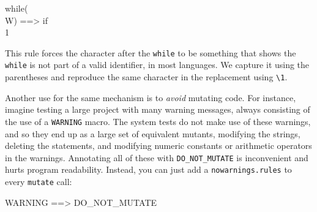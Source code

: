 \begin{code}
while(\\W) ==> if\\1 
\end{code}

\noindent This rule forces the character after the {\tt while} to be something
that shows the {\tt while} is not part of a valid identifier, in most
languages.  We capture it using the parentheses and reproduce the
same character in the replacement using {\tt \textbackslash1}.

Another use for the same mechanism is to \emph{avoid} mutating code.
For instance, imagine testing a large project with many warning
messages, always consisting of the use of a {\tt WARNING} macro.  The
system tests do not make use of these warnings, and so they end up as
a large set of equivalent mutants, modifying the strings, deleting the
statements, and modifying numeric constants or arithmetic operators in
the warnings.  Annotating all of these with {\tt DO\_NOT\_MUTATE} is
inconvenient and hurts program readability.  Instead, you can just add a
{\tt nowarnings.rules} to every {\tt mutate} call:

\begin{code}
WARNING ==> DO\_NOT\_MUTATE
\end{code}
